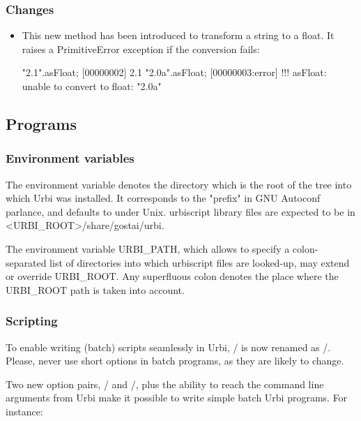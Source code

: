 \subsubsection{Changes}

\begin{itemize}
\item {}

  This new method has been introduced to transform a string to a float.  It
  raises a PrimitiveError exception if the conversion fails:

\begin{urbiscript}
"2.1".asFloat;
[00000002] 2.1
"2.0a".asFloat;
[00000003:error] !!! asFloat: unable to convert to float: "2.0a"
\end{urbiscript}
\end{itemize}

\subsection{Programs}

\subsubsection{Environment variables}

The environment variable  denotes the directory which
is the root of the tree into which Urbi was installed.  It corresponds
to the "prefix" in GNU Autoconf parlance, and defaults to
 under Unix.  urbiscript library files are expected
to be in <URBI\_ROOT>/share/gostai/urbi.

The environment variable URBI\_PATH, which allows to specify a
colon-separated list of directories into which urbiscript files are
looked-up, may extend or override URBI\_ROOT.  Any superfluous colon
denotes the place where the URBI\_ROOT path is taken into account.

\subsubsection{Scripting}

To enable writing (batch) scripts seamlessly in Urbi, 
/ is now renamed as /.
Please, never use short options in batch programs, as they are likely to
change.

Two new option pairs, / and
/, plus the ability to reach the command line
arguments from Urbi make it possible to write simple batch Urbi programs.
For instance:

